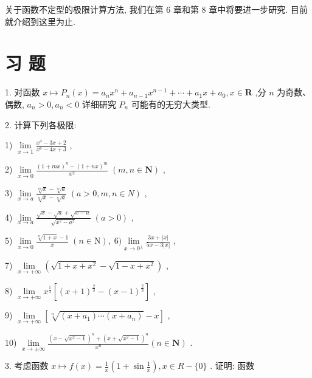 关于函数不定型的极限计算方法, 我们在第 6 章和第 8 章中将要进一步研究. 目前就介绍到这里为止.

\section*{习 题}

1. 对函数 $x \mapsto  {P}_{n}\left( x\right)  = {a}_{n}{x}^{n} + {a}_{n - 1}{x}^{n - 1} + \cdots  + {a}_{1}x + {a}_{0},x \in  \mathbf{R}$ ,分 $n$ 为奇数、偶数, ${a}_{n} > 0,{a}_{n} < 0$ 详细研究 ${P}_{n}$ 可能有的无穷大类型.

2. 计算下列各极限:

1) $\mathop{\lim }\limits_{{x \rightarrow  1}}\frac{{x}^{4} - {3x} + 2}{{x}^{6} - {4x} + 3}$ ,

2) $\mathop{\lim }\limits_{{x \rightarrow  0}}\frac{{\left( 1 + mx\right) }^{n} - {\left( 1 + nx\right) }^{m}}{{x}^{2}}\;\left( {m,n \in  \mathbf{N}}\right)$ ,

3) $\mathop{\lim }\limits_{{x \rightarrow  a}}\frac{\sqrt[m]{x} - \sqrt[m]{a}}{\sqrt[n]{x} - \sqrt[n]{a}}\;\left( {a > 0,m,n \in  N}\right)$ ,

4) $\mathop{\lim }\limits_{{x \rightarrow  a}}\frac{\sqrt{x} - \sqrt{a} + \sqrt{x - a}}{\sqrt{{x}^{2} - {a}^{2}}}\;\left( {a > 0}\right)$ ,

5) $\mathop{\lim }\limits_{{x \rightarrow  0}}\frac{\sqrt[n]{1 + x} - 1}{x}\;\left( {n \in  \mathrm{N}}\right) ,\;6)\mathop{\lim }\limits_{{x \rightarrow  {0}^{ \pm  }}}\frac{{3x} + \left| x\right| }{{5x} - 3\left| x\right| }$ ,

7) $\mathop{\lim }\limits_{{x \rightarrow   + \infty }}\left( {\sqrt{1 + x + {x}^{2}} - \sqrt{1 - x + {x}^{2}}}\right)$ ,

8) $\mathop{\lim }\limits_{{x \rightarrow   + \infty }}{x}^{\frac{1}{3}}\left\lbrack  {{\left( x + 1\right) }^{\frac{2}{3}} - {\left( x - 1\right) }^{\frac{2}{3}}}\right\rbrack$ ,

9) $\mathop{\lim }\limits_{{x \rightarrow   + \infty }}\left\lbrack  {\sqrt[n]{\left( {x + {a}_{1}}\right) \cdots \left( {x + {a}_{n}}\right) } - x}\right\rbrack$ ,

10) $\mathop{\lim }\limits_{{x \rightarrow   \pm  \infty }}\frac{{\left( x - \sqrt{{x}^{2} - 1}\right) }^{n} + {\left( x + \sqrt{{x}^{2} - 1}\right) }^{n}}{{x}^{n}}\left( {n \in  \mathbf{N}}\right)$ .

3. 考虑函数 $x \mapsto  f\left( x\right)  = \frac{1}{x}\left( {1 + \sin \frac{1}{x}}\right) ,x \in  R - \{ 0\}$ . 证明: 函数

